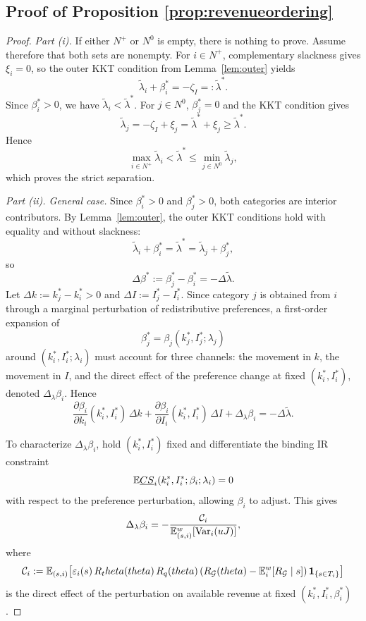 \documentclass[master.tex]{subfiles}
\begin{document}
\subsection{Proof of Proposition \ref{prop:revenueordering}}
\begin{proof}

\noindent\textit{Part (i).} If either $N^+$ or $N^0$ is empty, there is nothing to prove. Assume therefore that both sets are nonempty. For $i\in N^+$, complementary slackness gives $\xi_i=0$, so the outer KKT condition from Lemma~\ref{lem:outer} yields
\[
\tilde\lambda_i+\beta_i^\ast=-\zeta_I=:\tilde\lambda^\ast.
\]
Since $\beta_i^\ast>0$, we have $\tilde\lambda_i<\tilde\lambda^\ast$. For $j\in N^0$, $\beta_j^\ast=0$ and the KKT condition gives
\[
\tilde\lambda_j=-\zeta_I+\xi_j=\tilde\lambda^\ast+\xi_j\ge \tilde\lambda^\ast.
\]
Hence
\[
\max_{i\in N^+}\tilde\lambda_i<\tilde\lambda^\ast\le \min_{j\in N^0}\tilde\lambda_j,
\]
which proves the strict separation.

\noindent\textit{Part (ii). General case.} Since $\beta_i^\ast>0$ and $\beta_j^\ast>0$, both categories are interior contributors. By Lemma~\ref{lem:outer}, the outer KKT conditions hold with equality and without slackness:
\[
\tilde\lambda_i+\beta_i^\ast = \tilde\lambda^\ast = \tilde\lambda_j+\beta_j^\ast,
\]
so
\[
\Delta\beta^\ast:=\beta_j^\ast-\beta_i^\ast=-\Delta\tilde\lambda.
\]
Let $\Delta k:=k_j^\ast-k_i^\ast>0$ and $\Delta I:=I_j^\ast-I_i^\ast$. Since category $j$ is obtained from $i$ through a marginal perturbation of redistributive preferences, a first-order expansion of
\[
\beta_j^\ast=\beta_j(k_j^\ast,I_j^\ast;\lambda_j)
\]
around $(k_i^\ast,I_i^\ast;\lambda_i)$ must account for three channels: the movement in $k$, the movement in $I$, and the direct effect of the preference change at fixed $(k_i^\ast,I_i^\ast)$, denoted $\Delta_\lambda\beta_i$. Hence
\[
\frac{\partial \beta_i}{\partial k_i}(k_i^\ast,I_i^\ast)\,\Delta k
+
\frac{\partial \beta_i}{\partial I_i}(k_i^\ast,I_i^\ast)\,\Delta I
+
\Delta_\lambda\beta_i
=
-\Delta\tilde\lambda.
\]

To characterize $\Delta_\lambda\beta_i$, hold $(k_i^\ast,I_i^\ast)$ fixed and differentiate the binding IR constraint
\[
\mathbb{E}\underline{CS}_i(k_i^\ast,I_i^\ast;\beta_i;\lambda_i)=0
\]
with respect to the preference perturbation, allowing $\beta_i$ to adjust. This gives
\[
\Delta_\lambda\beta_i
=
-\frac{\mathcal C_i}{\mathbb{E}_{(s,i)}^w[\mathrm{Var}_i(uJ)]},
\]
where
\[
\mathcal C_i
:=
\mathbb{E}_{(s,i)}\!\left[
\varepsilon_i(s)\,R_theta(theta)\,R_q(theta)
\left(
R_{\mathcal G}(theta)-\mathbb{E}_i^w[R_{\mathcal G}\mid s]
\right)
\mathbf 1_{\{s\in T_i\}}
\right]
\]
is the direct effect of the perturbation on available revenue at fixed $(k_i^\ast,I_i^\ast,\beta_i^\ast)$.


\end{proof}
\end{document}
